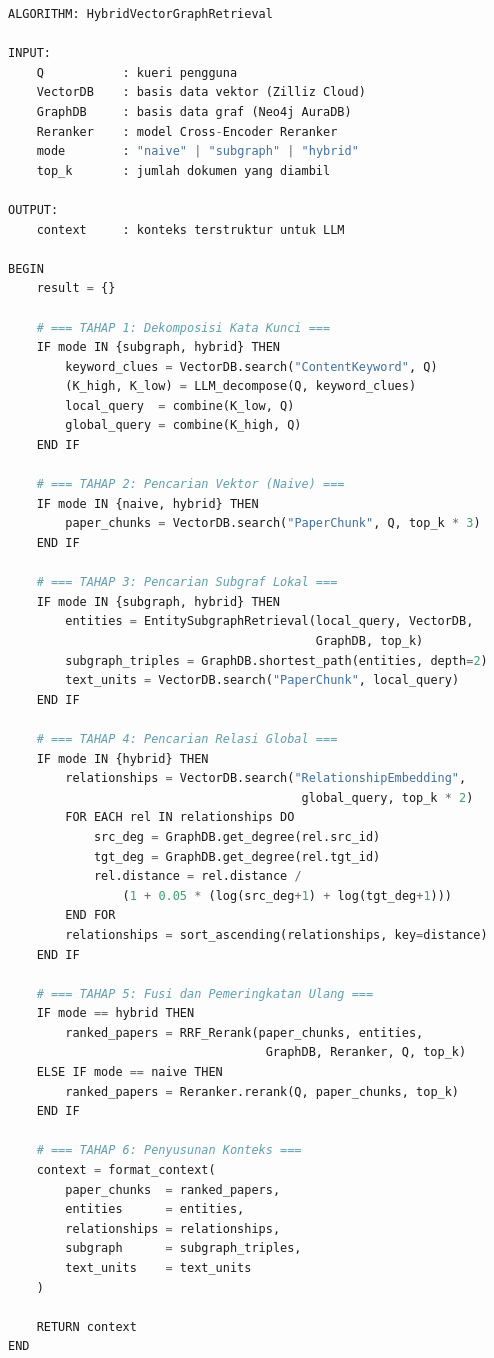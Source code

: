 \documentclass{SkripsiUnesa}
\begin{document}

\begin{lstlisting}[language=Python, caption={Algoritma \textit{Hybrid Vector-Graph Retrieval}}]
ALGORITHM: HybridVectorGraphRetrieval

INPUT:
    Q           : kueri pengguna
    VectorDB    : basis data vektor (Zilliz Cloud)
    GraphDB     : basis data graf (Neo4j AuraDB)
    Reranker    : model Cross-Encoder Reranker
    mode        : "naive" | "subgraph" | "hybrid"
    top_k       : jumlah dokumen yang diambil

OUTPUT:
    context     : konteks terstruktur untuk LLM

BEGIN
    result = {}

    # === TAHAP 1: Dekomposisi Kata Kunci ===
    IF mode IN {subgraph, hybrid} THEN
        keyword_clues = VectorDB.search("ContentKeyword", Q)
        (K_high, K_low) = LLM_decompose(Q, keyword_clues)
        local_query  = combine(K_low, Q)
        global_query = combine(K_high, Q)
    END IF

    # === TAHAP 2: Pencarian Vektor (Naive) ===
    IF mode IN {naive, hybrid} THEN
        paper_chunks = VectorDB.search("PaperChunk", Q, top_k * 3)
    END IF

    # === TAHAP 3: Pencarian Subgraf Lokal ===
    IF mode IN {subgraph, hybrid} THEN
        entities = EntitySubgraphRetrieval(local_query, VectorDB,
                                           GraphDB, top_k)
        subgraph_triples = GraphDB.shortest_path(entities, depth=2)
        text_units = VectorDB.search("PaperChunk", local_query)
    END IF

    # === TAHAP 4: Pencarian Relasi Global ===
    IF mode IN {hybrid} THEN
        relationships = VectorDB.search("RelationshipEmbedding",
                                         global_query, top_k * 2)
        FOR EACH rel IN relationships DO
            src_deg = GraphDB.get_degree(rel.src_id)
            tgt_deg = GraphDB.get_degree(rel.tgt_id)
            rel.distance = rel.distance /
                (1 + 0.05 * (log(src_deg+1) + log(tgt_deg+1)))
        END FOR
        relationships = sort_ascending(relationships, key=distance)
    END IF

    # === TAHAP 5: Fusi dan Pemeringkatan Ulang ===
    IF mode == hybrid THEN
        ranked_papers = RRF_Rerank(paper_chunks, entities,
                                    GraphDB, Reranker, Q, top_k)
    ELSE IF mode == naive THEN
        ranked_papers = Reranker.rerank(Q, paper_chunks, top_k)
    END IF

    # === TAHAP 6: Penyusunan Konteks ===
    context = format_context(
        paper_chunks  = ranked_papers,
        entities      = entities,
        relationships = relationships,
        subgraph      = subgraph_triples,
        text_units    = text_units
    )

    RETURN context
END
\end{lstlisting}
\end{document}
